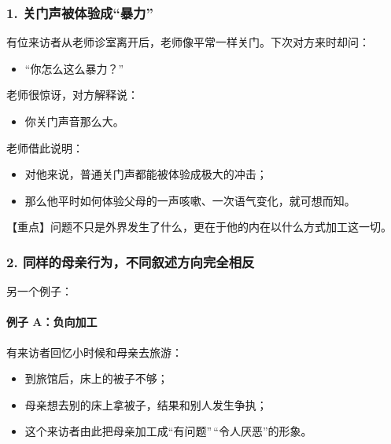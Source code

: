 \documentclass[
  chinese,
  9pt,
  a4paper,
]{ctexart}
\providecommand{\tightlist}{%
  \setlength{\itemsep}{0pt}\setlength{\parskip}{0pt}}
\begin{document}
\subsubsection{1.
关门声被体验成``暴力''}\label{ux5173ux95e8ux58f0ux88abux4f53ux9a8cux6210ux66b4ux529b}

有位来访者从老师诊室离开后，老师像平常一样关门。下次对方来时却问：

\begin{itemize}
\tightlist
\item
  ``你怎么这么暴力？''
\end{itemize}

老师很惊讶，对方解释说：

\begin{itemize}
\tightlist
\item
  你关门声音那么大。
\end{itemize}

老师借此说明：

\begin{itemize}
\tightlist
\item
  对他来说，普通关门声都能被体验成极大的冲击；
\item
  那么他平时如何体验父母的一声咳嗽、一次语气变化，就可想而知。
\end{itemize}

【重点】问题不只是外界发生了什么，更在于他的内在以什么方式加工这一切。

\subsubsection{2.
同样的母亲行为，不同叙述方向完全相反}\label{ux540cux6837ux7684ux6bcdux4eb2ux884cux4e3aux4e0dux540cux53d9ux8ff0ux65b9ux5411ux5b8cux5168ux76f8ux53cd}

另一个例子：

\paragraph{例子
A：负向加工}\label{ux4f8bux5b50-aux8d1fux5411ux52a0ux5de5}

有来访者回忆小时候和母亲去旅游：

\begin{itemize}
\tightlist
\item
  到旅馆后，床上的被子不够；
\item
  母亲想去别的床上拿被子，结果和别人发生争执；
\item
  这个来访者由此把母亲加工成``有问题''\,``令人厌恶''的形象。
\end{itemize}
\end{document}
